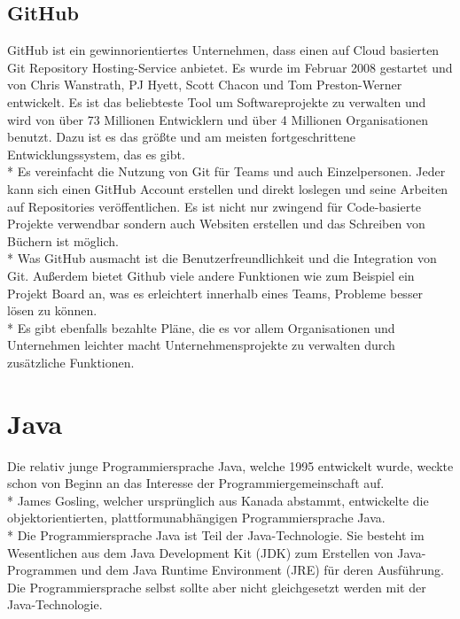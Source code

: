 \subsection{GitHub}
GitHub ist ein gewinnorientiertes Unternehmen, dass einen auf Cloud basierten Git Repository Hosting-Service anbietet.
Es wurde im Februar 2008 gestartet und von Chris Wanstrath, PJ Hyett, Scott Chacon und Tom Preston-Werner entwickelt.
Es ist das beliebteste Tool um Softwareprojekte zu verwalten und wird von über 73 Millionen Entwicklern und über 4 Millionen Organisationen
benutzt. Dazu ist es das größte und am meisten fortgeschrittene Entwicklungssystem, das es gibt. \cite{GitHub} \\*
Es vereinfacht die Nutzung von Git für Teams und auch Einzelpersonen. 
Jeder kann sich einen GitHub Account erstellen und direkt loslegen und seine Arbeiten auf Repositories veröffentlichen.
Es ist nicht nur zwingend für Code-basierte Projekte verwendbar sondern auch Websiten erstellen und das Schreiben von Büchern ist möglich.
\\*
Was GitHub ausmacht ist die Benutzerfreundlichkeit und die Integration von Git. Außerdem bietet Github viele andere Funktionen wie zum Beispiel ein Projekt Board an,
was es erleichtert innerhalb eines Teams, Probleme besser lösen zu können. \\*
Es gibt ebenfalls bezahlte Pläne, die es vor allem Organisationen und Unternehmen leichter macht Unternehmensprojekte zu verwalten durch zusätzliche Funktionen.
\cite{GitKinsta}



\section{Java}
\author{David Ignjatovic} 

Die relativ junge Programmiersprache Java, welche 1995 entwickelt wurde, weckte schon von Beginn an das Interesse der Programmiergemeinschaft auf. \cite{Java} \\*
James Gosling, welcher ursprünglich aus Kanada abstammt, entwickelte die objektorientierten, plattformunabhängigen Programmiersprache Java. \cite{JavaErfinder} \\*
Die Programmiersprache Java ist Teil der Java-Technologie. Sie besteht im Wesentlichen aus dem Java Development Kit (JDK) zum Erstellen von Java-Programmen und dem Java Runtime Environment (JRE) für deren Ausführung. 
Die Programmiersprache selbst sollte aber nicht gleichgesetzt werden mit der Java-Technologie. \cite{JavaSprache}


